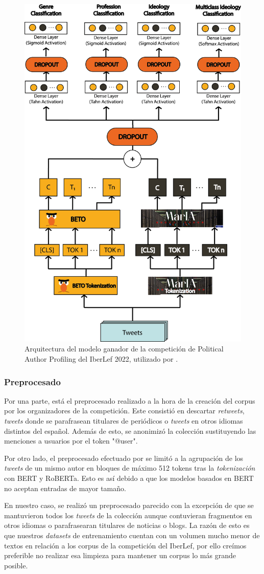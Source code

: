 \noindent\begin{figure}[hp!]
  \centering
    \includegraphics[height=0.8\textwidth]{imaxes/arquitectura_.png}
  \caption{Arquitectura del modelo ganador de la competición de Political Author Profiling del IberLef 2022, utilizado por \citet{loscalis22}.}
  \label{fig:arquitectura}
\end{figure}

\subsubsection{Preprocesado}

Por una parte, está el preprocesado realizado a la hora de la creación del corpus por los organizadores de la competición. Este consistió en descartar \textit{retweets}, \textit{tweets} donde se parafrasean titulares de periódicos o \textit{tweets} en otros idiomas distintos del español. Además de esto, se anonimizó la colección sustituyendo las menciones a usuarios por el token "@user".

Por otro lado, el preprocesado efectuado por \citet{loscalis22} se limitó a la agrupación de los \textit{tweets} de un mismo autor en bloques de máximo 512 tokens tras la \textit{tokenización} con BERT y RoBERTa. Esto es así debido a que los modelos basados en BERT no aceptan entradas de mayor tamaño.

En nuestro caso, se realizó un preprocesado parecido con la excepción de que se mantuvieron todos los \textit{tweets} de la colección aunque contuvieran fragmentos en otros idiomas o parafrasearan titulares de noticias o blogs. La razón de esto es que nuestros \textit{datasets} de entrenamiento cuentan con un volumen mucho menor de textos en relación a los corpus de la competición del IberLef, por ello creímos preferible no realizar esa limpieza para mantener un corpus lo más grande posible.

